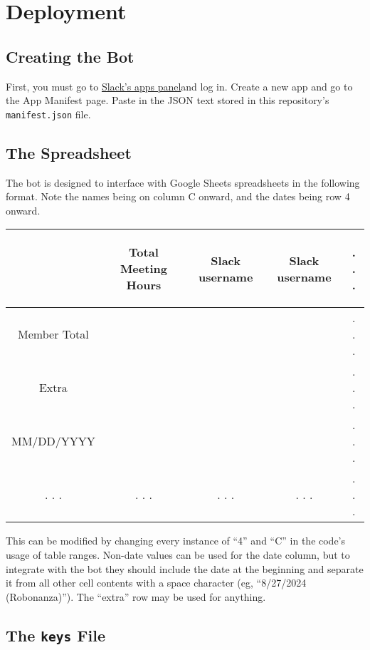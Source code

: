 \documentclass[english]{article}
\providecommand{\tabularnewline}{\\}
\begin{document}
\section{Deployment}

\subsection{Creating the Bot}

First, you must go to \href{https://api.slack.com/apps}{Slack's apps panel}and
log in. Create a new app and go to the App Manifest page. Paste in
the JSON text stored in this repository's \texttt{manifest.json} file.

\subsection{The Spreadsheet}

The bot is designed to interface with Google Sheets spreadsheets in
the following format. Note the names being on column C onward, and
the dates being row 4 onward.
\begin{center}
\begin{tabular}{|c||c|c|c|c}
\hline 
 & \begin{turn}{90}
Total Meeting Hours
\end{turn} & \begin{turn}{90}
Slack username
\end{turn} & \begin{turn}{90}
Slack username
\end{turn} & . . . \tabularnewline
\hline 
Member Total &  &  &  & . . .\tabularnewline
\hline 
\hline 
Extra &  &  &  & . . .\tabularnewline
\hline 
MM/DD/YYYY &  &  &  & . . .\tabularnewline
\hline 
. . . & . . . & . . . & . . . & . . .\tabularnewline
\end{tabular}
\par\end{center}

This can be modified by changing every instance of ``4'' and ``C''
in the code's usage of table ranges. Non-date values can be used for
the date column, but to integrate with the bot they should include
the date at the beginning and separate it from all other cell contents
with a space character (eg, ``8/27/2024 (Robonanza)''). The ``extra''
row may be used for anything.

\subsection{The \texttt{keys} File}
\end{document}
